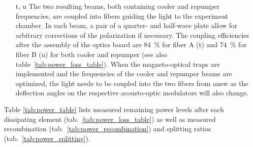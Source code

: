 \begin{itemize}
    \item[t, u] The two resulting beams, both containing cooler and repumper frequencies, are coupled into fibers guiding the light to the experiment chamber. In each beam, a pair of a quarter- and half-wave plate allow for arbitrary corrections of the polarization if necessary. The coupling efficiencies after the assembly of the optics board are \SI{84}{\percent} for fiber A (t) and \SI{74}{\percent} for fiber B (u) for both cooler and repumper (see also table~\ref{tab:power_loss_table}). When the magneto-optical traps are implemented and the frequencies of the cooler and repumper beams are optimized, the light needs to be coupled into the two fibers from anew as the deflection angles on the respective acousto-optic modulators will also change.
\end{itemize}

Table \ref{tab:power_table} lists measured remaining power levels after each dissipating element (tab.~\ref{tab:power_loss_table}) as well as measured recombination (tab.~\ref{tab:power_recombination}) and splitting ratios (tab.~\ref{tab:power_splitting}).

